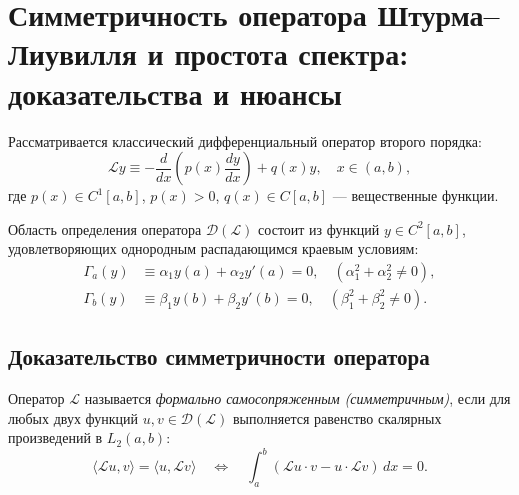 \documentclass[12pt,a4paper]{article}
\begin{document}
\section{Симметричность оператора Штурма--Лиувилля и простота спектра: доказательства и нюансы}

Рассматривается классический дифференциальный оператор второго порядка:
\begin{equation}
    \mathcal{L}y \equiv -\frac{d}{dx}\left(p(x)\frac{dy}{dx}\right) + q(x)y, \quad x \in (a, b),
    \label{eq:SL_operator}
\end{equation}
где $p(x) \in C^1[a, b]$, $p(x) > 0$, $q(x) \in C[a, b]$ — вещественные функции. 

Область определения оператора $\mathcal{D}(\mathcal{L})$ состоит из функций $y \in C^2[a, b]$, удовлетворяющих однородным распадающимся краевым условиям:
\begin{align}
    \Gamma_a(y) &\equiv \alpha_1 y(a) + \alpha_2 y'(a) = 0, \quad (\alpha_1^2 + \alpha_2^2 \neq 0), \label{eq:BC_left} \\
    \Gamma_b(y) &\equiv \beta_1 y(b) + \beta_2 y'(b) = 0, \quad (\beta_1^2 + \beta_2^2 \neq 0). \label{eq:BC_right}
\end{align}

\subsection{Доказательство симметричности оператора}

Оператор $\mathcal{L}$ называется \textit{формально самосопряженным (симметричным)}, если для любых двух функций $u, v \in \mathcal{D}(\mathcal{L})$ выполняется равенство скалярных произведений в $L_2(a, b)$:
\begin{equation}
    \langle \mathcal{L}u, v \rangle = \langle u, \mathcal{L}v \rangle \quad \iff \quad \int_a^b (\mathcal{L}u \cdot v - u \cdot \mathcal{L}v)\,dx = 0.
\end{equation}
\end{document}

